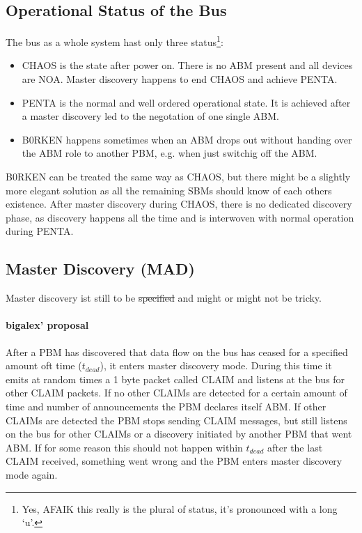 \documentclass[a4paper,12pt]{scrartcl}
\begin{document}
\subsection{Operational Status of the Bus}
The bus as a whole system hast only three status\footnote{Yes, AFAIK this really is the plural of status, it's pronounced with a long `u'.}:
\begin{itemize}
 \item CHAOS is the state after power on. There is no ABM present and all devices are NOA. Master discovery happens to end CHAOS and achieve PENTA.
 \item PENTA is the normal and well ordered operational state. It is achieved after a master discovery led to the negotation of one single ABM.
 \item B0RKEN happens sometimes when an ABM drops out without handing over the ABM role to another PBM, e.g. when just switchig off the ABM.
\end{itemize}
B0RKEN can be treated the same way as CHAOS, but there might be a slightly more elegant solution as all the remaining SBMs should know of each others existence.
After master discovery during CHAOS, there is no dedicated discovery phase, as discovery happens all the time and is interwoven with normal operation during PENTA.

\subsection{Master Discovery (MAD)}
Master discovery ist still to be \sout{specified}  and might or might not be tricky.

\paragraph{bigalex' proposal}

After a PBM has discovered that data flow on the bus has ceased for a specified amount oft time ($t_{dead}$),
it enters master discovery mode.
During this time it emits at random times a 1 byte packet called CLAIM and listens at the bus for other CLAIM packets.
If no other CLAIMs are detected for a certain amount of time and number of announcements the PBM declares itself ABM.
If other CLAIMs are detected the PBM stops sending CLAIM messages, but still listens on the bus for other CLAIMs or a discovery initiated by another PBM that went ABM.
If for some reason this should not happen within $t_{dead}$ after the last CLAIM received, something went wrong and the PBM enters master discovery mode again.
\end{document}
